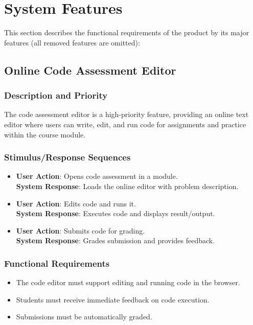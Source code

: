 \documentclass[a4paper, 11pt]{scrreprt}
\begin{document}
\chapter{System Features}

This section describes the functional requirements of the product by its major features (all removed features are omitted):

\section{Online Code Assessment Editor}

\subsection{Description and Priority}
The code assessment editor is a high-priority feature, providing an online text editor where users can write, edit, and run code for assignments and practice within the course module.

\subsection{Stimulus/Response Sequences}
\begin{itemize}
    \item \textbf{User Action}: Opens code assessment in a module.\\
          \textbf{System Response}: Loads the online editor with problem description.
    \item \textbf{User Action}: Edits code and runs it.\\
          \textbf{System Response}: Executes code and displays result/output.
    \item \textbf{User Action}: Submits code for grading.\\
          \textbf{System Response}: Grades submission and provides feedback.
\end{itemize}

\subsection{Functional Requirements}
\begin{itemize}
    \item The code editor must support editing and running code in the browser.
    \item Students must receive immediate feedback on code execution.
    \item Submissions must be automatically graded.
\end{itemize}
\end{document}
